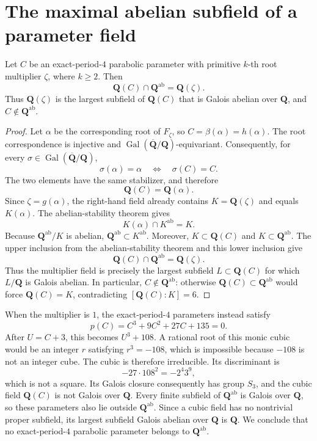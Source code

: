 \section{The maximal abelian subfield of a parameter field}

\begin{corollary}
\label{cor:maximal-abelian-parameter-field}
Let $C$ be an exact-period-$4$ parabolic parameter with primitive
$k$-th root multiplier $\zeta$, where $k\ge2$.  Then
\[
 \mathbf Q(C)\cap\mathbf Q^{\mathrm{ab}}=\mathbf Q(\zeta).
\]
Thus $\mathbf Q(\zeta)$ is the largest subfield of $\mathbf Q(C)$ that
is Galois abelian over $\mathbf Q$, and $C\notin\mathbf Q^{\mathrm{ab}}$.
\end{corollary}

\begin{proof}
Let $\alpha$ be the corresponding root of $F_\zeta$, so
$C=\beta(\alpha)=h(\alpha)$.  The root correspondence is injective and
$\operatorname{Gal}(\overline{\mathbf Q}/\mathbf Q)$-equivariant.
Consequently, for every
$\sigma\in\operatorname{Gal}(\overline{\mathbf Q}/\mathbf Q)$,
\[
 \sigma(\alpha)=\alpha
 \quad\Longleftrightarrow\quad
 \sigma(C)=C.
\]
The two elements have the same stabilizer, and therefore
\[
 \mathbf Q(C)=\mathbf Q(\alpha).
\]
Since $\zeta=g(\alpha)$, the right-hand field already contains
$K=\mathbf Q(\zeta)$ and equals $K(\alpha)$.  The abelian-stability
theorem gives
\[
 K(\alpha)\cap K^{\mathrm{ab}}=K.
\]
Because $\mathbf Q^{\mathrm{ab}}/K$ is abelian,
$\mathbf Q^{\mathrm{ab}}\subset K^{\mathrm{ab}}$.  Moreover,
$K\subset\mathbf Q(C)$ and $K\subset\mathbf Q^{\mathrm{ab}}$.  The
upper inclusion from the abelian-stability theorem and this lower
inclusion give
\begin{equation}\label{eq:parameter-abelian-intersection}
 \mathbf Q(C)\cap\mathbf Q^{\mathrm{ab}}=\mathbf Q(\zeta).
\end{equation}
Thus the multiplier field is precisely the largest subfield
$L\subset\mathbf Q(C)$ for which $L/\mathbf Q$ is Galois abelian.  In
particular,
$C\notin\mathbf Q^{\mathrm{ab}}$: otherwise
$\mathbf Q(C)\subset\mathbf Q^{\mathrm{ab}}$ would force
$\mathbf Q(C)=K$, contradicting $[\mathbf Q(C):K]=6$.
\end{proof}

When the multiplier is $1$, the exact-period-$4$ parameters instead
satisfy
\[
 p(C)=C^3+9C^2+27C+135=0.
\]
After $U=C+3$, this becomes $U^3+108$.  A rational root of this monic
cubic would be an integer $r$ satisfying $r^3=-108$, which is
impossible because $-108$ is not an integer cube.  The cubic is
therefore irreducible.  Its discriminant is
\[
 -27\cdot108^2=-2^4 3^9,
\]
which is not a square.  Its Galois closure consequently has group
$S_3$, and the cubic field $\mathbf Q(C)$ is not Galois over $\mathbf Q$.  Every
finite subfield of $\mathbf Q^{\mathrm{ab}}$ is Galois over
$\mathbf Q$, so these parameters also lie outside
$\mathbf Q^{\mathrm{ab}}$.  Since a cubic field has no nontrivial proper
subfield, its largest subfield Galois abelian over $\mathbf Q$ is
$\mathbf Q$.  We conclude that no exact-period-$4$
parabolic parameter belongs to $\mathbf Q^{\mathrm{ab}}$.

